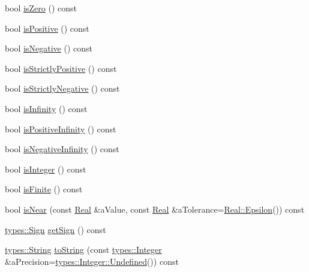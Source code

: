 \begin{DoxyCompactItemize}
\item 
bool \hyperlink{classlibrary_1_1core_1_1types_1_1_real_a7f9a08009b4d5033ff8c9eaa4a6b2c7e}{is\+Zero} () const
\item 
bool \hyperlink{classlibrary_1_1core_1_1types_1_1_real_af2ace2b52781a5e537daef7e6cee6df3}{is\+Positive} () const
\item 
bool \hyperlink{classlibrary_1_1core_1_1types_1_1_real_aa12d6c4d50c80dc184e34d6e52c9dd10}{is\+Negative} () const
\item 
bool \hyperlink{classlibrary_1_1core_1_1types_1_1_real_ac96efb831bb08fd5cfe0f8cfc18ee6b1}{is\+Strictly\+Positive} () const
\item 
bool \hyperlink{classlibrary_1_1core_1_1types_1_1_real_a91029945199886cd83279f29cc225b91}{is\+Strictly\+Negative} () const
\item 
bool \hyperlink{classlibrary_1_1core_1_1types_1_1_real_a4603222d9315aa59355778d66c0b214d}{is\+Infinity} () const
\item 
bool \hyperlink{classlibrary_1_1core_1_1types_1_1_real_a432e5a765554e8656e9bcb6d54f1553d}{is\+Positive\+Infinity} () const
\item 
bool \hyperlink{classlibrary_1_1core_1_1types_1_1_real_a5d7286e45a9f05cda79402c9d8efbc13}{is\+Negative\+Infinity} () const
\item 
bool \hyperlink{classlibrary_1_1core_1_1types_1_1_real_ad2709f64d24cb119403a0a6d386f5eda}{is\+Integer} () const
\item 
bool \hyperlink{classlibrary_1_1core_1_1types_1_1_real_a3355dd60d401e1f464d0bc20be9a32d5}{is\+Finite} () const
\item 
bool \hyperlink{classlibrary_1_1core_1_1types_1_1_real_a59cda3a7c738f0d0244e408dadeb079c}{is\+Near} (const \hyperlink{classlibrary_1_1core_1_1types_1_1_real}{Real} \&a\+Value, const \hyperlink{classlibrary_1_1core_1_1types_1_1_real}{Real} \&a\+Tolerance=\hyperlink{classlibrary_1_1core_1_1types_1_1_real_a5f3b76a5055cb042c25448b873e39663}{Real\+::\+Epsilon}()) const
\item 
\hyperlink{namespacelibrary_1_1core_1_1types_a06d9eaa410d43a0fa3f383040618e87d}{types\+::\+Sign} \hyperlink{classlibrary_1_1core_1_1types_1_1_real_a0e92ad5d5a946dcc64385e1bf47003c8}{get\+Sign} () const
\item 
\hyperlink{classlibrary_1_1core_1_1types_1_1_string}{types\+::\+String} \hyperlink{classlibrary_1_1core_1_1types_1_1_real_a5d2632591e723b672323c60f1f4ec0be}{to\+String} (const \hyperlink{classlibrary_1_1core_1_1types_1_1_integer}{types\+::\+Integer} \&a\+Precision=\hyperlink{classlibrary_1_1core_1_1types_1_1_integer_a142c2df49031b787daf30673c73fcad7}{types\+::\+Integer\+::\+Undefined}()) const

\end{DoxyCompactItemize}
